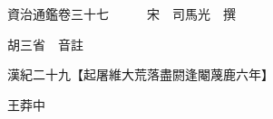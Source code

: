 










 


 
 


 

  
  
  
  
  





  
  
  
  
  
 
  

  

  
  
  



  

 
 

  
   




  

  
  


  　　資治通鑑卷三十七　　　宋　司馬光　撰

　　胡三省　音註

　　漢紀二十九【起屠維大荒落盡閼逢閹蔑鹿六年】

　　王莽中


